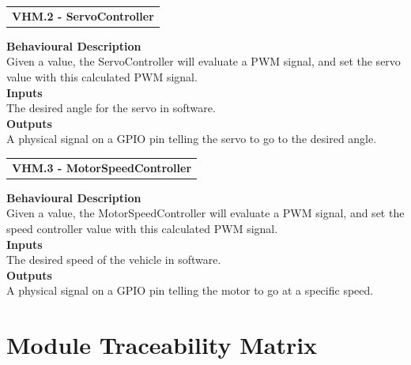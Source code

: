 \documentclass [10pt]{article}
\begin{document}


\begin{longtable}{p{}}
\rowcolor{tableCell}\textbf{VHM.2 - ServoController} \\
\end{longtable}
\textbf{Behavioural Description} \\
    Given a value, the ServoController will evaluate a PWM signal, and set the servo value with this calculated PWM signal.\\

\textbf{Inputs} \\
The desired angle for the servo in software. \\

\textbf{Outputs} \\
A physical signal on a GPIO pin telling the servo to go to the desired angle. \\

\begin{longtable}{ p{}}
\rowcolor{tableCell}\textbf{VHM.3 - MotorSpeedController} \\
\end{longtable}
\textbf{Behavioural Description} \\
    Given a value, the MotorSpeedController will evaluate a PWM signal, and set the speed controller value with this calculated PWM signal.\\

\textbf{Inputs} \\
The desired speed of the vehicle in software. \\

\textbf{Outputs} \\
A physical signal on a GPIO pin telling the motor to go at a specific speed. \\


\section{Module Traceability Matrix}
\end{document}

